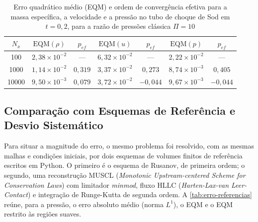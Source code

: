 \begin{table}[H]
    \centering
    \caption{Erro quadrático médio (EQM) e ordem de convergência efetiva para a massa específica, a velocidade e a pressão no tubo de choque de Sod em \(t = 0{,}2\), para a razão de pressões clássica \(\Pi = 10\)}
    \label{tab:convergencia-eqm}
    \begin{tabular}{ccccccc}
        \toprule
        \(N_x\) & \(\mathrm{EQM}(\rho)\) & \(p_{ef}\) & \(\mathrm{EQM}(u)\) & \(p_{ef}\) & \(\mathrm{EQM}(p)\) & \(p_{ef}\) \\
        \midrule
        100 & \(2{,}38\times10^{-2}\) & --- & \(6{,}32\times10^{-2}\) & --- & \(2{,}22\times10^{-2}\) & --- \\
        1000 & \(1{,}14\times10^{-2}\) & \(0{,}319\) & \(3{,}37\times10^{-2}\) & \(0{,}273\) & \(8{,}74\times10^{-3}\) & \(0{,}405\) \\
        10000 & \(9{,}50\times10^{-3}\) & \(0{,}079\) & \(3{,}72\times10^{-2}\) & \(-0{,}044\) & \(9{,}67\times10^{-3}\) & \(-0{,}044\) \\
        \bottomrule
    \end{tabular}
\end{table}


\subsection{Comparação com Esquemas de Referência e Desvio Sistemático}\label{subsec:erro-sistematico}

Para situar a magnitude do erro, o mesmo problema foi resolvido, com as mesmas malhas e condições iniciais, por dois esquemas de volumes finitos de referência escritos em Python.
O primeiro é o esquema de Rusanov, de primeira ordem; o segundo, uma reconstrução MUSCL (\textit{Monotonic Upstream-centered Scheme for Conservation Laws}) com limitador \textit{minmod}, fluxo HLLC (\textit{Harten-Lax-van Leer-Contact}) e integração de Runge-Kutta de segunda ordem.
A \autoref{tab:erro-referencias} reúne, para a pressão, o erro absoluto médio (norma \(L^1\)), o EQM e o EQM restrito às regiões suaves.

